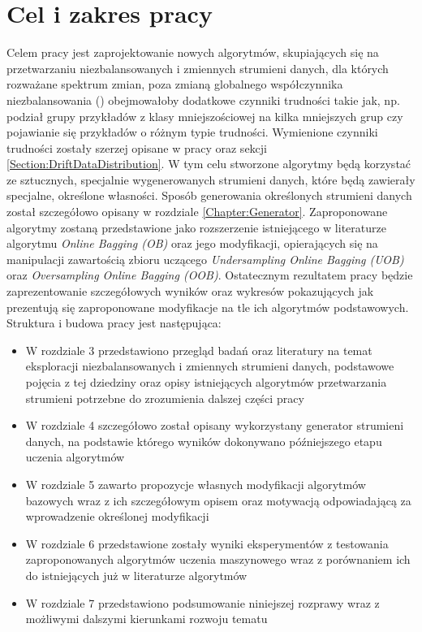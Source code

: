 \chapter{Cel i zakres pracy}

\noindent Celem pracy jest zaprojektowanie nowych algorytmów, skupiających się na przetwarzaniu niezbalansowanych i zmiennych strumieni danych, dla których rozważane spektrum zmian, poza zmianą globalnego współczynnika niezbalansowania () obejmowałoby dodatkowe czynniki trudności takie jak, np. podział grupy przykładów z klasy mniejszościowej na kilka mniejszych grup czy pojawianie się przykładów o różnym typie trudności. Wymienione czynniki trudności zostały szerzej opisane w pracy \cite{Article:TypyPrzykladow} oraz sekcji \ref{Section:DriftDataDistribution}. W tym celu stworzone algorytmy będą korzystać ze sztucznych, specjalnie wygenerowanych strumieni danych, które będą zawierały specjalne, określone własności. Sposób generowania określonych strumieni danych został szczegółowo opisany w rozdziale \ref{Chapter:Generator}. Zaproponowane algorytmy zostaną przedstawione jako rozszerzenie istniejącego w literaturze algorytmu \textit{Online Bagging (OB)} oraz jego modyfikacji, opierających się na manipulacji zawartością zbioru uczącego \textit{Undersampling Online Bagging (UOB)} oraz \textit{Oversampling Online Bagging (OOB)}. Ostatecznym rezultatem pracy będzie zaprezentowanie szczegółowych wyników oraz wykresów pokazujących jak prezentują się zaproponowane modyfikacje na tle ich algorytmów podstawowych.\\

\noindent Struktura i budowa pracy jest następująca:

\begin{itemize}
    \item W rozdziale 3 przedstawiono przegląd badań oraz literatury na temat eksploracji niezbalansowanych i zmiennych strumieni danych, podstawowe pojęcia z tej dziedziny oraz opisy istniejących algorytmów przetwarzania strumieni potrzebne do zrozumienia dalszej części pracy
    \item W rozdziale 4 szczegółowo został opisany wykorzystany generator strumieni danych, na podstawie którego wyników dokonywano późniejszego etapu uczenia algorytmów
    \item W rozdziale 5 zawarto propozycje własnych modyfikacji algorytmów bazowych wraz z ich szczegółowym opisem oraz motywacją odpowiadającą za wprowadzenie określonej modyfikacji
    \item W rozdziale 6 przedstawione zostały wyniki eksperymentów z testowania zaproponowanych algorytmów uczenia maszynowego wraz z porównaniem ich do istniejących już w literaturze algorytmów
    \item W rozdziale 7 przedstawiono podsumowanie niniejszej rozprawy wraz z możliwymi dalszymi kierunkami rozwoju tematu
\end{itemize}

